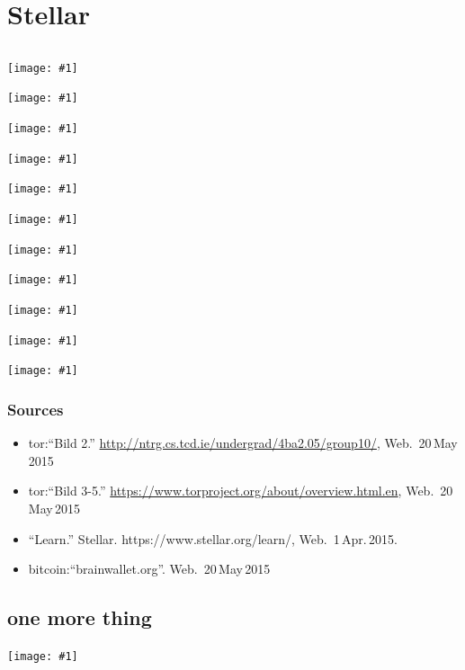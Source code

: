 \documentclass[12pt,english]{beamer}
\newcommand {\framedgraphic}[1] {
    \begin{frame}
        \begin{center}
            \texttt{[image: \#1]}
        \end{center}
    \end{frame}
}
\begin{document}
\section{Stellar}
\subsection{}


\framedgraphic{./img/stellar_presentation/bild_1.jpg}

\framedgraphic{./img/stellar_presentation/bild_2.jpg}

\framedgraphic{./img/stellar_presentation/bild_3.jpg}

\framedgraphic{./img/stellar_presentation/bild_4.png}

\framedgraphic{./img/stellar_presentation/bild_5.jpg}

\framedgraphic{./img/stellar_presentation/bild_6.jpg}

\framedgraphic{./img/stellar_presentation/bild_7.jpg}

\framedgraphic{./img/stellar_presentation/bild_8.jpg}

\framedgraphic{./img/stellar_presentation/bild_9.jpg}

\framedgraphic{./img/stellar_presentation/bild_10.jpg}

\framedgraphic{./img/stellar_presentation/bild_11.png}

\begin{frame}
	\frametitle{Sources}
	\begin{itemize}
		\item tor:\enquote{Bild 2.} \url{http://ntrg.cs.tcd.ie/undergrad/4ba2.05/group10/}, Web.~20\,May\,2015
		\item tor:\enquote{Bild 3-5.} \url{https://www.torproject.org/about/overview.html.en}, Web.~20\,May\,2015
		\item \enquote{Learn.} Stellar. https://www.stellar.org/learn/, Web.~1\,Apr.\,2015. 
		\item bitcoin:\enquote{brainwallet.org}. Web.~20\,May\,2015
	\end{itemize}
\end{frame}

\subsection{one more thing}

\framedgraphic{./img/btc_presentation/jsjeopardy.png}
\end{document}
